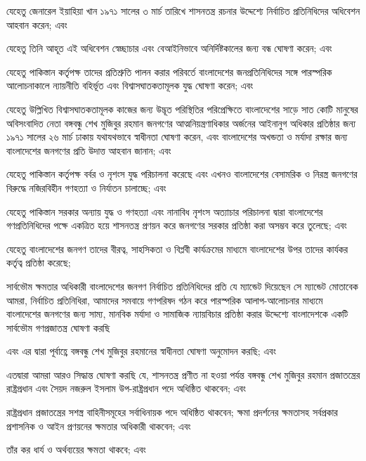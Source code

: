 \documentclass[11pt]{article}
\begin{document}
যেহেতু জেনারেল ইয়াহিয়া খান ১৯৭১ সালের ৩ মার্চ তারিখে শাসনতন্ত্র রচনার
উদ্দেশ্যে নির্বাচিত প্রতিনিধিদের অধিবেশন আহবান করেন; এবং

যেহেতু তিনি আহূত এই অধিবেশন স্বেচ্ছাচার এবং বেআইনিভাবে অনির্দিষ্টকালের জন্য
বন্ধ ঘোষণা করেন; এবং

যেহেতু পাকিস্তান কর্তৃপক্ষ তাদের প্রতিশ্রুতি পালন করার পরিবর্তে বাংলাদেশের
জনপ্রতিনিধিদের সঙ্গে পারস্পরিক আলোচনাকালে ন্যায়নীতি বহির্ভূত এবং
বিশ্বাসঘাতকতামূলক যুদ্ধ ঘোষণা করেন; এবং

যেহেতু উল্লিখিত বিশ্বাসঘাতকতামূলক কাজের জন্য উদ্ভূত পরিস্থিতির পরিপ্রেক্ষিতে
বাংলাদেশের সাড়ে সাত কোটি মানুষের অবিসংবাদিত নেতা বঙ্গবন্ধু শেখ মুজিবুর রহমান
জনগণের আত্মনিয়ন্ত্রণাধিকার অর্জনের আইনানুগ অধিকার প্রতিষ্ঠার জন্য ১৯৭১ সালের
২৬ মার্চ ঢাকায় যথাযথভাবে স্বাধীনতা ঘোষণা করেন, এবং বাংলাদেশের অখন্ডতা ও
মর্যাদা রক্ষার জন্য বাংলাদেশের জনগণের প্রতি উদাত্ত আহবান জানান; এবং

যেহেতু পাকিস্তান কর্তৃপক্ষ বর্বর ও নৃশংস যুদ্ধ পরিচালনা করেছে এবং এখনও
বাংলাদেশের বেসামরিক ও নিরস্ত্র জনগণের বিরুদ্ধে নজিরবিহীন গণহত্যা ও নির্যাতন
চালাচ্ছে; এবং

যেহেতু পাকিস্তান সরকার অন্যায় যুদ্ধ ও গণহত্যা এবং নানাবিধ নৃশংস অত্যাচার
পরিচালনা দ্বারা বাংলাদেশের গণপ্রতিনিধিদের পক্ষে একত্রিত হয়ে শাসনতন্ত্র প্রণয়ন
করে জনগণের সরকার প্রতিষ্ঠা করা অসম্ভব করে তুলেছে; এবং

যেহেতু বাংলাদেশের জনগণ তাদের বীরত্ব, সাহসিকতা ও বিপ্লবী কার্যক্রমের মাধ্যমে
বাংলাদেশের উপর তাদের কার্যকর কর্তৃত্ব প্রতিষ্ঠা করেছে;

সার্বভৌম ক্ষমতার অধিকারী বাংলাদেশের জনগণ নির্বাচিত প্রতিনিধিদের প্রতি যে
ম্যান্ডেট দিয়েছেন সে ম্যান্ডেট মোতাবেক আমরা, নির্বাচিত প্রতিনিধিরা, আমাদের
সমবায়ে গণপরিষদ গঠন করে পারস্পরিক আলাপ-আলোচনার মাধ্যমে বাংলাদেশের জনগণের
জন্য সাম্য, মানবিক মর্যাদা ও সামাজিক ন্যায়বিচার প্রতিষ্ঠা করার উদ্দেশ্যে
বাংলাদেশকে একটি সার্বভৌম গণপ্রজাতন্ত্র ঘোষণা করছি

এবং এর দ্বারা পূর্বাহ্ণে বঙ্গবন্ধু শেখ মুজিবুর রহমানের স্বাধীনতা ঘোষণা অনুমোদন
করছি; এবং

এতদ্বারা আমরা আরও সিদ্ধান্ত ঘোষণা করছি যে, শাসনতন্ত্র প্রণীত না হওয়া পর্যন্ত
বঙ্গবন্ধু শেখ মুজিবুর রহমান প্রজাতন্ত্রের রাষ্ট্রপ্রধান এবং সৈয়দ নজরুল ইসলাম
উপ-রাষ্ট্রপ্রধান পদে অধিষ্ঠিত থাকবেন; এবং

রাষ্ট্রপ্রধান প্রজাতন্ত্রের সশস্ত্র বাহিনীসমূহের সর্বাধিনায়ক পদে অধিষ্ঠিত থাকবেন;
ক্ষমা প্রদর্শনের ক্ষমতাসহ সর্বপ্রকার প্রশাসনিক ও আইন প্রণয়নের ক্ষমতার অধিকারী
থাকবেন; এবং

তাঁর কর ধার্য ও অর্থব্যয়ের ক্ষমতা থাকবে; এবং
\end{document}
